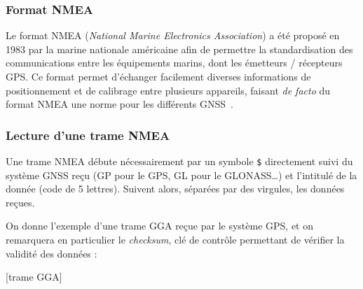       \subsubsection{Format NMEA}
         Le format NMEA (\textit{National Marine Electronics Association}) a été proposé en 1983 par la marine nationale américaine afin de permettre la standardisation des communications entre les équipements marins, dont les émetteurs / récepteurs GPS\@.
         Ce format permet d'échanger facilement diverses informations de positionnement et de calibrage entre plusieurs appareils, faisant \textit{de facto} du format NMEA une norme pour les différents GNSS~\cite{hofmann-wellenhofGNSSGlobalNavigation2007}.

      \subsubsection{Lecture d'une trame NMEA}
         Une trame NMEA débute nécessairement par un symbole \texttt{\$} directement suivi du système GNSS reçu (GP pour le GPS, GL pour le GLONASS\dots) et l'intitulé de la donnée (code de 5 lettres).
         Suivent alors, séparées par des virgules, les données reçues.

         On donne l'exemple d'une trame GGA reçue par le système GPS, et on remarquera en particulier le \textit{checksum}, clé de contrôle permettant de vérifier la validité des données :

         [trame GGA]